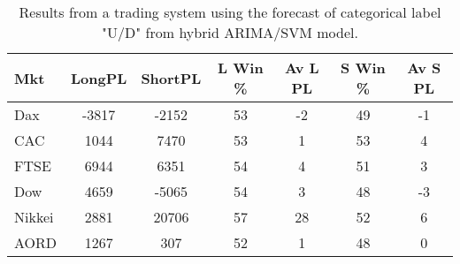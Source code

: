 \begin{table}[ht]
\centering
\caption[Results from a trading system using the forecast of categorical label "U/D" from hybrid ARIMA/SVM model]{Results from a trading system using the forecast of categorical label "U/D" from hybrid ARIMA/SVM model.} 
\label{tab:chp_ts:pUD_CAT_arima_svm_sys}
\begin{tabular}{lcccccc}
  \toprule Mkt & LongPL & ShortPL & L Win \% & Av L PL & S Win \% & Av S PL \\ 
  \midrule Dax & -3817 & -2152 & 53 & -2 & 49 & -1 \\ 
  CAC & 1044 & 7470 & 53 & 1 & 53 & 4 \\ 
  FTSE & 6944 & 6351 & 54 & 4 & 51 & 3 \\ 
  Dow & 4659 & -5065 & 54 & 3 & 48 & -3 \\ 
  Nikkei & 2881 & 20706 & 57 & 28 & 52 & 6 \\ 
  AORD & 1267 & 307 & 52 & 1 & 48 & 0 \\ 
   \bottomrule \end{tabular}
\end{table}
